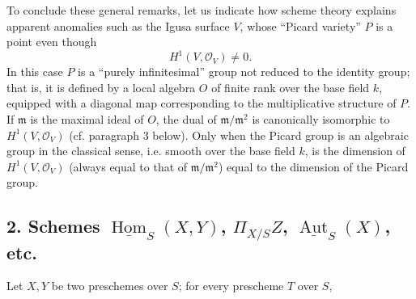 To conclude these general remarks, let us indicate how scheme theory explains
apparent anomalies such as the Igusa surface $V$, whose “Picard variety” $P$
is a point even though
\[
  H^1(V,\mathcal O_V)\ne 0.
\]
In this case $P$ is a “purely infinitesimal” group not reduced to the identity
group; that is, it is defined by a local algebra $O$ of finite rank over the
base field $k$, equipped with a diagonal map corresponding to the
multiplicative structure of $P$. If $\mathfrak m$ is the maximal ideal of $O$,
the dual of $\mathfrak m/\mathfrak m^2$ is canonically isomorphic to
$H^1(V,\mathcal O_V)$ (cf. paragraph 3 below). Only when the Picard group is an
algebraic group in the classical sense, i.e. smooth over the base field $k$,
is the dimension of $H^1(V,\mathcal O_V)$ (always equal to that of
$\mathfrak m/\mathfrak m^2$) equal to the dimension of the Picard group.

\subsection*{2. Schemes $\underline{\operatorname{Hom}}_S(X,Y)$,
$\Pi_{X/S}Z$, $\underline{\operatorname{Aut}}_S(X)$, etc.}

Let $X,Y$ be two preschemes over $S$; for every prescheme $T$ over $S$,

